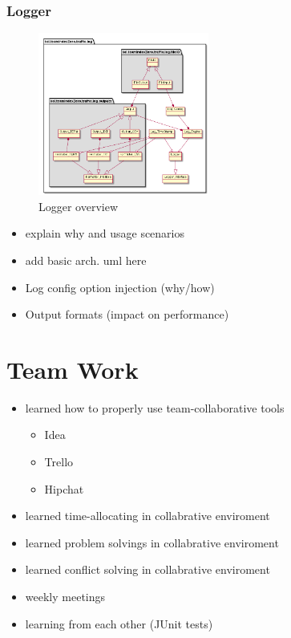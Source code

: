 \subsubsection{Logger}

\begin{figure}[h!]
	\vspace{1.5em}
  	\caption{Logger overview}
  	\label{fig:logger_overview}
  	\centering
	\includegraphics[width=0.5\textwidth]{figs/logModuleObjectDiagram.png}
  	\vspace{1.5em}
\end{figure}

    \begin{itemize}
        \item explain why and usage scenarios
        \item add basic arch. uml here
        \item Log config option injection (why/how)
        \item Output formats (impact on performance)
    \end{itemize}
    

\section{Team Work}

    \begin{itemize}
        \item learned how to properly use team-collaborative tools

            \begin{itemize}
                \item Idea
                \item Trello
                \item Hipchat
         \end{itemize}
        \item learned time-allocating in collabrative enviroment
        \item learned  problem solvings in collabrative enviroment
        \item learned  conflict solving in collabrative enviroment
        \item weekly meetings
        \item learning from each other (JUnit tests)

    \end {itemize}

